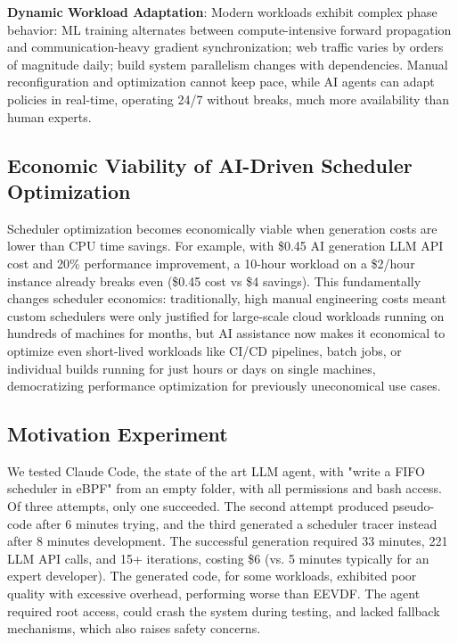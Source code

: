 \documentclass[preprint]{article}
\begin{document}
\textbf{Dynamic Workload Adaptation}: Modern workloads exhibit complex phase behavior: ML training alternates between compute-intensive forward propagation and communication-heavy gradient synchronization; web traffic varies by orders of magnitude daily; build system parallelism changes with dependencies. Manual reconfiguration and optimization cannot keep pace, while AI agents can adapt policies in real-time, operating 24/7 without breaks, much more availability than human experts.

\subsection{Economic Viability of AI-Driven Scheduler Optimization}

Scheduler optimization becomes economically viable when generation costs are lower than CPU time savings. For example, with \$0.45 AI generation LLM API cost and 20\% performance improvement, a 10-hour workload on a \$2/hour instance already breaks even (\$0.45 cost vs \$4 savings). This fundamentally changes scheduler economics: traditionally, high manual engineering costs meant custom schedulers were only justified for large-scale cloud workloads running on hundreds of machines for months, but AI assistance now makes it economical to optimize even short-lived workloads like CI/CD pipelines, batch jobs, or individual builds running for just hours or days on single machines, democratizing performance optimization for previously uneconomical use cases.

\subsection{Motivation Experiment}

We tested Claude Code\cite{claudecode}, the state of the art LLM agent, with "write a FIFO scheduler in eBPF" from an empty folder, with all permissions and bash access. Of three attempts, only one succeeded. The second attempt produced pseudo-code after 6 minutes trying, and the third generated a scheduler tracer instead after 8 minutes development. The successful generation required 33 minutes, 221 LLM API calls, and 15+ iterations, costing \$6 (vs. 5 minutes typically for an expert developer). The generated code, for some workloads, exhibited poor quality with excessive overhead, performing worse than EEVDF. The agent required root access, could crash the system during testing, and lacked fallback mechanisms, which also raises safety concerns.
\end{document}
